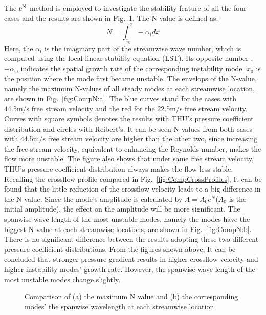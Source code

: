 \documentclass{AIAA}
\begin{document}
The ${\rm e^N}$ method is employed to investigate the stability feature of all the four cases and the results are shown in Fig.~\ref{fig:CompN}. The N-value is defined as:
\begin{equation}\label{e:eNdef}
  N=\int_{x_0}^x -\alpha_idx
\end{equation}
Here, the $\alpha_i$ is the imaginary part of the streamwise wave number, which is computed using the local linear stability equation (LST). Its opposite number , $-\alpha_i$, indicates the spatial growth rate of the corresponding instability mode. $x_0$ is the position where the mode first became unstable. The envelops of the N-value, namely the maximum N-values of all steady modes at each streamwise location, are shown in Fig.~\ref{fig:CompN:a}. The blue curves stand for the cases with 44.5m/s free stream velocity and the red for the 22.5m/s free stream velocity. Curves with square symbols denotes the results with THU's pressure coefficient distribution and circles with Reibert's. It can be seen N-values from both cases with 44.5m/s free stream velocity are higher than the other two, since increasing the free stream velocity, equivalent to enhancing the Reynolds number, makes the flow more unstable. The figure also shows that under same free stream velocity, THU's pressure coefficient distribution always makes the flow less stable. Recalling the crossflow profile compared in Fig.~\ref{fig:CompCrossProfiles}, It can be found that the little reduction of the crossflow velocity leads to a big difference in the N-value. Since the mode's amplitude is calculated by $A=A_0e^{N}$($A_0$ is the initial amplitude), the effect on the amplitude will be more significant. The spanwise wave length of the most unstable modes, namely the modes have the biggest N-value at each streamwise locations, are shown in Fig.~\ref{fig:CompN:b}. There is no significant difference between the results adopting these two different pressure coefficient distributions. From the figures shown above, It can be concluded that stronger pressure gradient results in higher crossflow velocity and higher instability modes' growth rate. However, the spanwise wave length of the most unstable modes change slightly.
\begin{figure}
\centering
{}
\caption{Comparison of (a) the maximum N value and (b) the corresponding modes' the spanwise wavelength at each streamwise location }
\label{fig:CompN} %
\end{figure}
\end{document}
